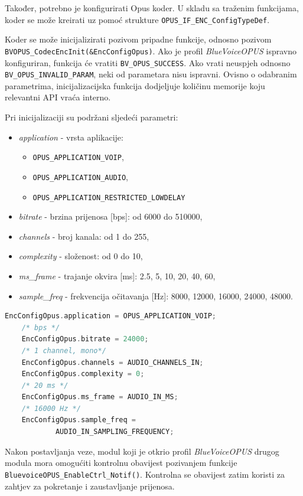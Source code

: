 Također, potrebno je konfigurirati Opus koder. U skladu sa traženim funkcijama, koder se može kreirati uz pomoć strukture \newline \lstinline|OPUS_IF_ENC_ConfigTypeDef|.

Koder se može inicijalizirati pozivom pripadne funkcije, odnosno pozivom \newline \lstinline|BVOPUS_CodecEncInit(&EncConfigOpus)|. Ako je profil \textit{BlueVoiceOPUS} ispravno konfiguriran, funkcija će vratiti \lstinline|BV_OPUS_SUCCESS|. Ako vrati neuspjeh odnosno \lstinline|BV_OPUS_INVALID_PARAM|, neki od parametara nisu ispravni. Ovisno o odabranim parametrima, inicijalizacijska funkcija dodjeljuje količinu memorije koju relevantni API vraća interno. 

Pri inicijalizaciji su podržani sljedeći parametri:
\begin{itemize}
	\item \textit{application} - vrsta aplikacije:
	\begin{itemize}
		\item \lstinline|OPUS_APPLICATION_VOIP|, 
		\item \lstinline|OPUS_APPLICATION_AUDIO|,
		\item  \lstinline|OPUS_APPLICATION_RESTRICTED_LOWDELAY|
	\end{itemize}
	\item \textit{bitrate} - brzina prijenosa [bps]: od 6000 do 510000,
	\item \textit{channels} - broj kanala: od 1 do 255,
	\item \textit{complexity} - složenost: od 0 do 10,
	\item \textit{ms\_frame} - trajanje okvira [ms]: 2.5, 5, 10, 20, 40, 60,
	\item \textit{sample\_freq} - frekvencija očitavanja [Hz]: 8000, 12000, 16000, 24000, 48000.
\end{itemize}

\begin{lstlisting}[caption={Parametri za Opus koder}, language=c]
	EncConfigOpus.application = OPUS_APPLICATION_VOIP;
	/* bps */
	EncConfigOpus.bitrate = 24000; 
	/* 1 channel, mono*/
	EncConfigOpus.channels = AUDIO_CHANNELS_IN; 
	EncConfigOpus.complexity = 0;
	/* 20 ms */
	EncConfigOpus.ms_frame = AUDIO_IN_MS; 
	/* 16000 Hz */
	EncConfigOpus.sample_freq = 
			AUDIO_IN_SAMPLING_FREQUENCY; 
\end{lstlisting}

Nakon postavljanja veze, modul koji je otkrio profil \textit{BlueVoiceOPUS} drugog modula mora omogućiti kontrolnu obavijest pozivanjem funkcije \newline \lstinline|BluevoiceOPUS_EnableCtrl_Notif()|. Kontrolna se obavijest zatim koristi za zahtjev za pokretanje i zaustavljanje prijenosa.

